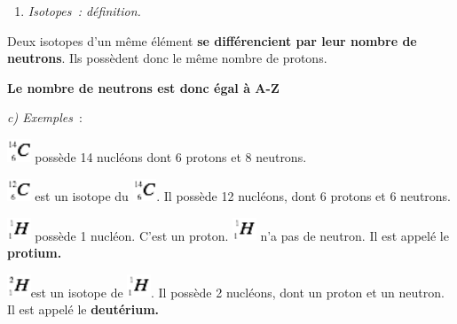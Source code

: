 \begin{enumerate}
\def\labelenumi{\alph{enumi})}
\tightlist
\item
  \emph{Isotopes~: définition. }
\end{enumerate}

Deux isotopes d'un même élément \textbf{se différencient par leur nombre
de neutrons}. Ils possèdent donc le même nombre de protons.

\textbf{Le nombre de neutrons est donc égal à A-Z}

\emph{c) Exemples}~:

\includegraphics[width=0.706cm,height=0.683cm]{Pictures/1000000100000014000000139893D1A91E50D164.png}
possède 14 nucléons dont 6 protons et 8 neutrons.

\includegraphics[width=0.706cm,height=0.683cm]{Pictures/100000010000001400000013946388155A247608.png}
est un isotope du
\includegraphics[width=0.706cm,height=0.683cm]{Pictures/1000000100000014000000139893D1A91E50D164.png}.
Il possède 12 nucléons, dont 6 protons et 6 neutrons.

\includegraphics[width=0.706cm,height=0.683cm]{Pictures/100000010000001400000013CF06E53ED3B18878.png}
possède 1 nucléon. C'est un proton.
\includegraphics[width=0.706cm,height=0.683cm]{Pictures/100000010000001400000013CF06E53ED3B18878.png}
n'a pas de neutron. Il est appelé le \textbf{protium.}

\includegraphics[width=0.706cm,height=0.683cm]{Pictures/1000000100000014000000131B86356A5F025E11.png}est
un isotope de
\includegraphics[width=0.706cm,height=0.683cm]{Pictures/100000010000001400000013CF06E53ED3B18878.png}.
Il possède 2 nucléons, dont un proton et un neutron. Il est appelé le
\textbf{deutérium.}

